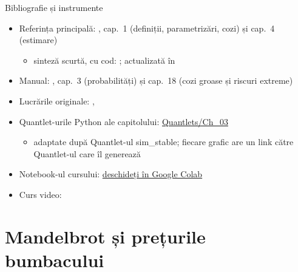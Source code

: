 \begin{frame}{Bibliografie și instrumente}
\itemsize{\small}
\begin{itemize}
    \item Referința principală: , cap.~1 (definiții, parametrizări, cozi) și cap.~4 (estimare)
    \begin{itemize}
        \item sinteză scurtă, cu cod: ; actualizată în 
    \end{itemize}
    \item Manual: , cap.~3 (probabilități) și cap.~18 (cozi groase și riscuri extreme)
    \item Lucrările originale: , 
    \item Quantlet-urile Python ale capitolului: \href{https://github.com/danpele/SFM/tree/main/Quantlets/Ch_03}{Quantlets/Ch\_03}
    \begin{itemize}
        \item adaptate după Quantlet-ul sim\_stable; fiecare grafic are un link către Quantlet-ul care îl generează
    \end{itemize}
    \item Notebook-ul cursului: \href{\colaburl{notebooks/EN/chapter3_lecture_notebook.ipynb}}{deschideți în Google Colab}
    \item Curs video: 
\end{itemize}
\end{frame}


\section{Mandelbrot și prețurile bumbacului}

